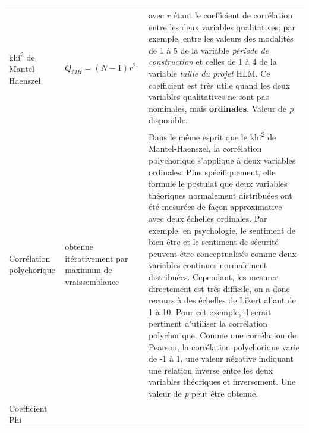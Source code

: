 \documentclass[
  11pt,
  french,
]{book}
\makeatletter
\newenvironment{kframev}{%
\medskip{}
\setlength{\fboxsep}{.8em}
 \def\at@end@of@kframev{}%
 \ifinner\ifhmode%
  \def\at@end@of@kframev{\end{minipage}}%
  \begin{minipage}{\columnwidth}%
 \fi\fi%
 \def\FrameCommand##1{\hskip\@totalleftmargin \hskip-\fboxsep
 \colorbox{shadebluecolor}{##1}\hskip-\fboxsep
     \hskip-\linewidth \hskip-\@totalleftmargin \hskip\columnwidth}%
 \MakeFramed {\advance\hsize-\width
   \@totalleftmargin\z@ \linewidth\hsize
   \@setminipage}}%
 {\par\unskip\endMakeFramed%
 \at@end@of@kframev}
\newenvironment{rmdblock}[1]
  {
  \begin{itemize}
  \renewcommand{\labelitemi}{
    \raisebox{-.7\height}[0pt][0pt]{
      {\setkeys{Gin}{width=3em,keepaspectratio}\texttt{[image: images/\#1]}}
    }
  }
  \setlength{\fboxsep}{1em}
  \begin{kframev}
  \small
  \item
  }
  {
  \end{kframev}
  \end{itemize}
  }
\newenvironment{bloc_aller_loin}
  {\begin{rmdblock}{aller_loin}}
  {\end{rmdblock}}
\makeatother
\begin{document}
\begin{bloc_aller_loin}
\begin{longtable}[]{@{}lll@{}}
\begin{minipage}[t]{0.60\columnwidth}
\end{minipage}\tabularnewline
\begin{minipage}[t]{0.17\columnwidth}\raggedright
khi\textsuperscript{2} de Mantel-Haenszel\strut
\end{minipage} & \begin{minipage}[t]{0.15\columnwidth}\raggedright
\(Q_{MH}=(N−1)r^2\)\strut
\end{minipage} & \begin{minipage}[t]{0.60\columnwidth}\raggedright
avec \(r\) étant le coefficient de corrélation entre les deux variables qualitatives; par exemple, entre les valeurs des modalités de 1 à 5 de la variable \emph{période de construction} et celles de 1 à 4 de la variable \emph{taille du projet} HLM. Ce coefficient est très utile quand les deux variables qualitatives ne sont pas nominales, mais \textbf{ordinales}. Valeur de \emph{p} disponible.\strut
\end{minipage}\tabularnewline
\begin{minipage}[t]{0.17\columnwidth}\raggedright
Corrélation polychorique\strut
\end{minipage} & \begin{minipage}[t]{0.15\columnwidth}\raggedright
obtenue itérativement par maximum de vraissemblance\strut
\end{minipage} & \begin{minipage}[t]{0.60\columnwidth}\raggedright
Dans le même esprit que le khi\textsuperscript{2} de Mantel-Haenszel, la corrélation polychorique s'applique à deux variables ordinales. Plus spécifiquement, elle formule le postulat que deux variables théoriques normalement distribuées ont été mesurées de façon approximative avec deux échelles ordinales. Par exemple, en psychologie, le sentiment de bien être et le sentiment de sécurité peuvent être conceptualisés comme deux variables continues normalement distribuées. Cependant, les mesurer directement est très difficile, on a donc recours à des échelles de Likert allant de 1 à 10. Pour cet exemple, il serait pertinent d'utiliser la corrélation polychorique. Comme une corrélation de Pearson, la corrélation polychorique varie de -1 à 1, une valeur négative indiquant une relation inverse entre les deux variables théoriques et inversement. Une valeur de \emph{p} peut être obtenue.\strut
\end{minipage}\tabularnewline
\begin{minipage}[t]{0.17\columnwidth}\raggedright
Coefficient Phi\strut
\end{minipage} & \begin{minipage}[t]{0.15\columnwidth}\raggedright

\end{minipage}
\end{longtable}
\end{bloc_aller_loin}
\end{document}
